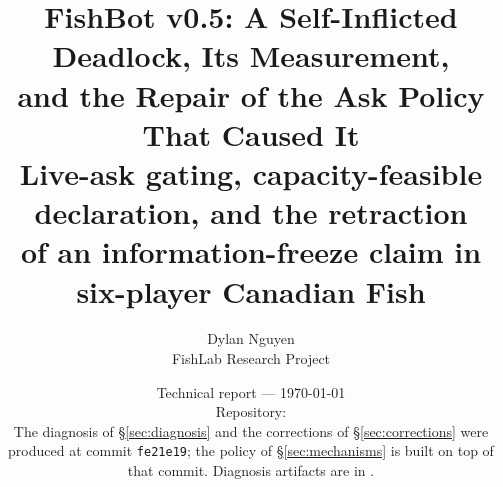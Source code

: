 \documentclass[11pt]{article}
\title{\textbf{FishBot v0.5: A Self-Inflicted Deadlock, Its Measurement,\\
and the Repair of the Ask Policy That Caused It}\\[5pt]
\large Live-ask gating, capacity-feasible declaration, and the retraction\\
of an information-freeze claim in six-player Canadian Fish}
\author{Dylan Nguyen\\\small FishLab Research Project}
\date{%
  \small Technical report --- \today\\[2pt]
  \small Repository: \filepath{https://github.com/dylann29/fish-optimization}\\[1pt]
  \small The diagnosis of \S\ref{sec:diagnosis} and the corrections of
  \S\ref{sec:corrections} were produced at commit \texttt{fe21e19}; the \vfive{}
  policy of \S\ref{sec:mechanisms} is built on top of that commit. Diagnosis
  artifacts are in \filepath{research/v05/results/}.%
}
\theoremstyle{definition}
\begin{document}
\maketitle
\thispagestyle{fancy}

\begin{abstract}

\end{abstract}













\end{document}
